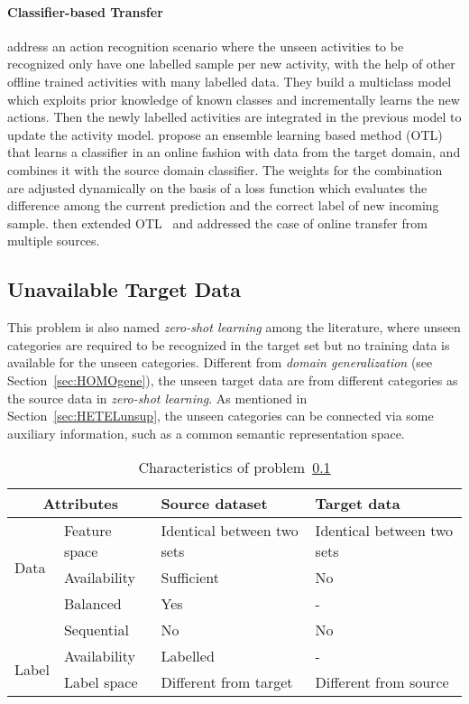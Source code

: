 \documentclass[prodmode]{acmsmall}  %
\begin{document}
\paragraph{Classifier-based Transfer}
 address an action recognition scenario where the unseen activities to be recognized only have one labelled sample per new activity, with the help of other offline trained activities with many labelled data. They build a multiclass model which exploits prior knowledge of known classes and incrementally learns the new actions. Then the newly labelled activities are integrated in the previous model to update the activity model.  propose an ensemble learning based method (OTL) that learns a classifier in an online fashion with data from the target domain, and combines it with the source domain classifier. The weights for the combination are adjusted dynamically on the basis of a loss function which evaluates the difference among the current prediction and the correct label of new incoming sample.  then extended OTL~\cite{Zhao2010} and addressed the case of online transfer from multiple sources. 

\subsection{Unavailable Target Data}
\label{sec:HETELzero}
This problem is also named \textit{zero-shot learning} among the literature, where unseen categories are required to be recognized in the target set but no training data is available for the unseen categories. Different from \textit{domain generalization} (see Section~\ref{sec:HOMOgene}), the unseen target data are from different categories as the source data in \textit{zero-shot learning}. 
As mentioned in Section~\ref{sec:HETELunsup}, the unseen categories can be connected via some auxiliary information, such as a common semantic representation space. 
\begin{table}[htbp!]
\caption{Characteristics of problem~\ref{sec:HETELzero}}
\label{tab:HETELzero}
\begin{center}
\begin{small}
\begin{tabular}{|p{1cm}<{\centering}|m{2.5cm}<{\centering}|m{4.3cm}<{\centering}|m{4.3cm}<{\centering}|}
\hline
\multicolumn{2}{|c|}{Attributes} & Source dataset & Target data \\
\hline \hline
\multirow{3}{*}{Data} & Feature space & Identical between two sets & Identical between two sets \\ 
\cline{2-4}{} & Availability & Sufficient & {\color{red} No} \\
\cline{2-4}{} & Balanced & Yes & - \\
\cline{2-4}{} & Sequential & No & No \\
\hline \hline
\multirow{2}{*}{Label} & Availability & Labelled & -\\
\cline{2-4}{}  & Label space & Different from target & {\color{red}Different from source} \\ 
\hline
\end{tabular}
\end{small}
\end{center}
\end{table}
\end{document}
